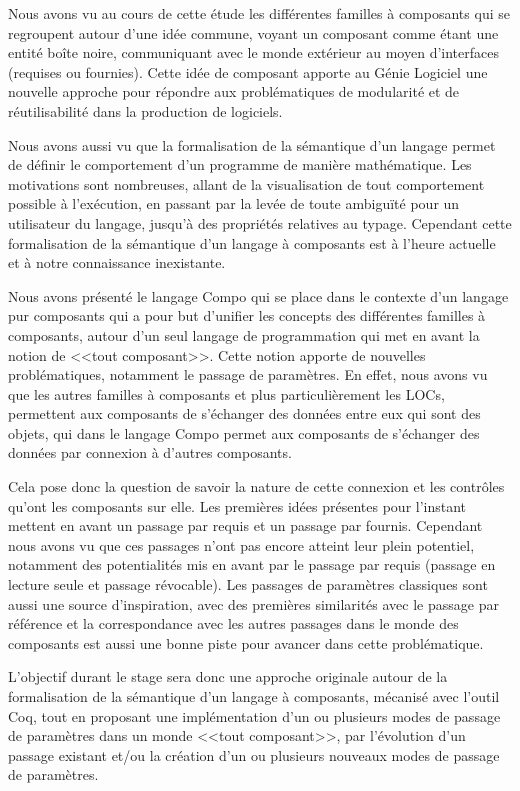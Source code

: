 
 Nous avons vu au cours de cette étude les différentes familles à composants qui se regroupent autour d'une idée commune, voyant un composant comme étant une entité boîte noire, communiquant avec le monde extérieur au moyen d'interfaces (requises ou fournies). Cette idée de composant apporte au Génie Logiciel une nouvelle approche pour répondre aux problématiques de modularité et de réutilisabilité dans la production de logiciels.
 
 Nous avons aussi vu que la formalisation de la sémantique d'un langage permet de définir le comportement d'un programme de manière mathématique. Les motivations sont nombreuses, allant de la visualisation de tout comportement possible à l'exécution, en passant par la levée de toute ambiguïté pour un utilisateur du langage, jusqu'à des propriétés relatives au typage. Cependant cette formalisation de la sémantique d'un langage à composants est à l'heure actuelle et à notre connaissance inexistante. 
 
  Nous avons présenté le langage Compo qui se place dans le contexte d'un langage pur composants qui a pour but d'unifier les concepts des différentes familles à composants, autour d'un seul langage de programmation qui met en avant la notion de <<tout composant>>. Cette notion apporte de nouvelles problématiques, notamment le passage de paramètres. En effet, nous avons vu que les autres familles à composants et plus particulièrement les LOCs, permettent aux composants de s'échanger des données entre eux qui sont des objets, qui dans le langage Compo permet aux composants de s'échanger des données par connexion à d'autres composants.

 Cela pose donc la question de savoir la nature de cette connexion et les contrôles qu'ont les composants sur elle. Les premières idées présentes pour l'instant mettent en avant un passage par requis et un passage par fournis. Cependant nous avons vu que ces passages n'ont pas encore atteint leur plein potentiel, notamment des potentialités mis en avant par le passage par requis (passage en lecture seule et passage révocable). Les passages de paramètres classiques sont aussi une source d'inspiration, avec des premières similarités avec le passage par référence et la correspondance avec les autres passages dans le monde des composants est aussi une bonne piste pour avancer dans cette problématique.
 
   L'objectif durant le stage sera donc une approche originale autour de la formalisation de la sémantique d'un langage à composants, mécanisé avec l'outil Coq, tout en proposant une implémentation d'un ou plusieurs modes de passage de paramètres dans un monde <<tout composant>>, par l'évolution d'un passage existant et/ou la création d'un ou plusieurs nouveaux modes de passage de paramètres.
   

   
   
   
   
